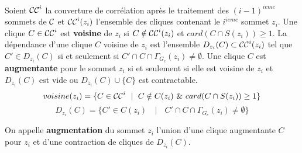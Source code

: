 \begin{definition}
Soient 
${\cal CC}^{i}$ la couverture de corr\'elation apr\`es le traitement des $(i-1)^{ieme}$ sommets de ${\cal C}$ et
${\cal CC}^{i}(z_i)$ l'ensemble des cliques contenant le $i^{ieme}$ sommet $z_i$.
\newline
Une clique $C \in {\cal CC}^{i}$ est {\bf voisine} de $z_i$ si $C \notin {\cal CC}^{i}(z_i)$ et $card(C \cap S(z_i)) \ge 1$.
La d\'ependance d'une clique $C$ voisine de $z_i$ est l'ensemble $D_{z_i}(C) \subset {\cal CC}^{i}(z_i)$ tel que $C' \in D_{z_i}(C)$ si et seulement si  $C' \cap C \cap \Gamma_{G_c}(z_i) \ne \emptyset$.
\newline
Une clique $C$ est {\bf augmentante} pour le sommet $z_i$ si et seulement si elle est voisine de $z_i$ et  $D_{z_i}(C)$ est vide  ou $D_{z_i}(C) \cup \{C\}$ est contractable.
\begin{equation}
voisine(z_i) = \{C \in {\cal CC}^{i} \mbox{ } \mid \mbox{ } C \notin C(z_i) \mbox{ } \& \mbox{ } card(C \cap S(z_i)) \ge 1 \} \newline
\end{equation}
\begin{equation}
D_{z_i}(C) = \{ C' \in C(z_i) \mbox{ } \mid  \mbox{ } C' \cap C \cap \Gamma_{G_c}(z_i) \ne \emptyset \}
\end{equation}
\end{definition}

On appelle {\bf  augmentation} du sommet $z_i$ l'union d'une clique augmentante  $C$ pour $z_i$ et d'une contraction de cliques de $D_{z_i}(C)$.
\newline

